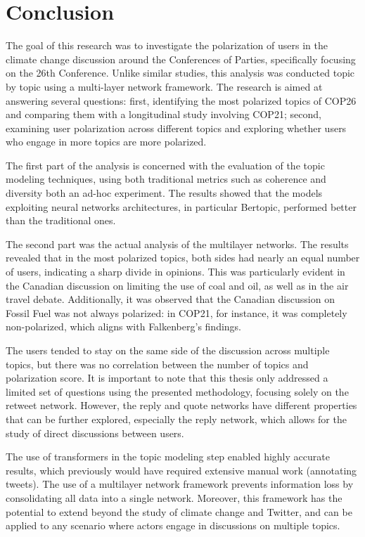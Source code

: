 \chapter{Conclusion}
\label{ch:conclusion}
The goal of this research was to investigate the polarization of users in the climate change discussion around the Conferences of Parties, specifically focusing on the 26th Conference. Unlike similar studies, this analysis was conducted topic by topic using a multi-layer network framework. The research is aimed at answering several questions: first, identifying the most polarized topics of COP26 and comparing them with a longitudinal study involving COP21; second, examining user polarization across different topics and exploring whether users who engage in more topics are more polarized.

The first part of the analysis is concerned with the evaluation of the topic modeling techniques, using both traditional metrics such as coherence and diversity both an ad-hoc experiment. The results showed that the models exploiting neural networks architectures, in particular Bertopic, performed better than the traditional ones.

The second part was the actual analysis of the multilayer networks.
The results revealed that in the most polarized topics, both sides had nearly an equal number of users, indicating a sharp divide in opinions. This was particularly evident in the Canadian discussion on limiting the use of coal and oil, as well as in the air travel debate. Additionally, it was observed that the Canadian discussion on Fossil Fuel was not always polarized: in COP21, for instance, it was completely non-polarized, which aligns with Falkenberg's findings.

The users tended to stay on the same side of the discussion across multiple topics, but there was no correlation between the number of topics and polarization score. It is important to note that this thesis only addressed a limited set of questions using the presented methodology, focusing solely on the retweet network. However, the reply and quote networks have different properties that can be further explored, especially the reply network, which allows for the study of direct discussions between users.

The use of transformers in the topic modeling step enabled highly accurate results, which previously would have required extensive manual work (annotating tweets). The use of a multilayer network framework prevents information loss by consolidating all data into a single network. Moreover, this framework has the potential to extend beyond the study of climate change and Twitter, and can be applied to any scenario where actors engage in discussions on multiple topics.

